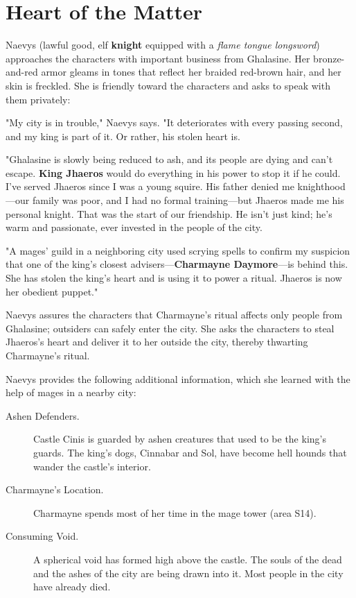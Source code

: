 \documentclass[10pt,a4paper,twoside,bg=print,twocolumn,openany,nodeprecatedcode]{dndbook}
\begin{document}
\section{Heart of the Matter}
Naevys (lawful good, elf \textbf{knight} equipped with a \textit{flame tongue longsword}) approaches the characters with important business from Ghalasine. Her bronze-and-red armor gleams in tones that reflect her braided red-brown hair, and her skin is freckled. She is friendly toward the characters and asks to speak with them privately:

\begin{DndReadAloud}{}
"My city is in trouble," Naevys says. "It deteriorates with every passing second, and my king is part of it. Or rather, his stolen heart is.

"Ghalasine is slowly being reduced to ash, and its people are dying and can't escape. \textbf{King Jhaeros} would do everything in his power to stop it if he could. I've served Jhaeros since I was a young squire. His father denied me knighthood—our family was poor, and I had no formal training—but Jhaeros made me his personal knight. That was the start of our friendship. He isn't just kind; he's warm and passionate, ever invested in the people of the city.

"A mages' guild in a neighboring city used scrying spells to confirm my suspicion that one of the king's closest advisers—\textbf{Charmayne Daymore}—is behind this. She has stolen the king's heart and is using it to power a ritual. Jhaeros is now her obedient puppet."

\end{DndReadAloud}

Naevys assures the characters that Charmayne's ritual affects only people from Ghalasine; outsiders can safely enter the city. She asks the characters to steal Jhaeros's heart and deliver it to her outside the city, thereby thwarting Charmayne's ritual.

Naevys provides the following additional information, which she learned with the help of mages in a nearby city:


\begin{description}
\item[Ashen Defenders.]
Castle Cinis is guarded by ashen creatures that used to be the king's guards. The king's dogs, Cinnabar and Sol, have become hell hounds that wander the castle's interior.
\item[Charmayne's Location.]
Charmayne spends most of her time in the mage tower (area S14).
\item[Consuming Void.]
A spherical void has formed high above the castle. The souls of the dead and the ashes of the city are being drawn into it. Most people in the city have already died.
\end{description}
\end{document}
